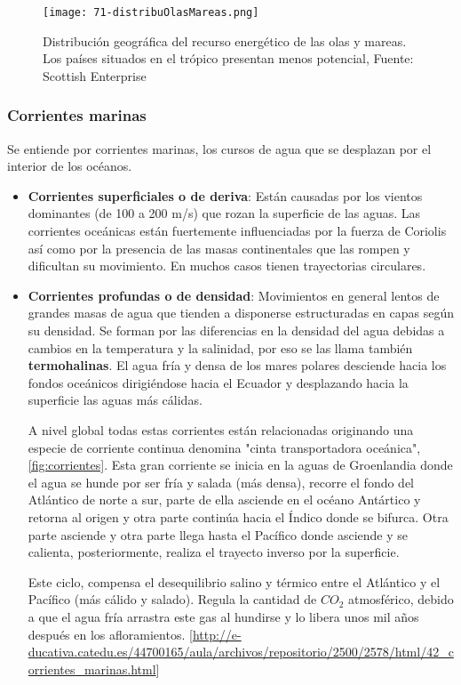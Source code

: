 \begin{figure}
\centering
\texttt{[image: 71-distribuOlasMareas.png]}
\caption[Distribución geográfica del recurso energético]{Distribución geográfica del recurso energético de las olas y mareas. Los países situados en el trópico presentan menos potencial, Fuente: Scottish Enterprise}
\label{fig:distribOlas}
\end{figure}

\subsubsection{Corrientes marinas}\label{header-n28}

Se entiende por corrientes marinas, los cursos de agua que se desplazan
por el interior de los océanos.

\begin{itemize}
\item
  \textbf{Corrientes superficiales o de deriva}: Están causadas por los
  vientos dominantes (de 100 a 200 m/s) que rozan la superficie de las
  aguas. Las corrientes oceánicas están fuertemente influenciadas por la
  fuerza de Coriolis así como por la presencia de las masas
  continentales que las rompen y dificultan su movimiento. En muchos
  casos tienen trayectorias circulares.
\item
  \textbf{Corrientes profundas o de densidad}: Movimientos en general
  lentos de grandes masas de agua que tienden a disponerse estructuradas
  en capas según su densidad. Se forman por las diferencias en la
  densidad del agua debidas a cambios en la temperatura y la salinidad,
  por eso se las llama también \textbf{termohalinas}. El agua fría y
  densa de los mares polares desciende hacia los fondos oceánicos
  dirigiéndose hacia el Ecuador y desplazando hacia la superficie las
  aguas más cálidas.

  A nivel global todas estas corrientes están relacionadas originando
  una especie de corriente continua denomina "cinta transportadora
  oceánica", \autoref{fig:corrientes}. Esta gran corriente se inicia en la aguas de Groenlandia
  donde el agua se hunde por ser fría y salada (más densa), recorre el
  fondo del Atlántico de norte a sur, parte de ella asciende en el
  océano Antártico y retorna al origen y otra parte continúa hacia el
  Índico donde se bifurca. Otra parte asciende y otra parte llega hasta
  el Pacífico donde asciende y se calienta, posteriormente, realiza el
  trayecto inverso por la superficie.

  Este ciclo, compensa el desequilibrio salino y térmico entre el
  Atlántico y el Pacífico (más cálido y salado). Regula la cantidad de
  \(CO_2\) atmosférico, debido a que el agua fría arrastra este gas al
  hundirse y lo libera unos mil años después en los afloramientos.
  {[}\url{http://e-ducativa.catedu.es/44700165/aula/archivos/repositorio/2500/2578/html/42_corrientes_marinas.html}{]}
\end{itemize}

